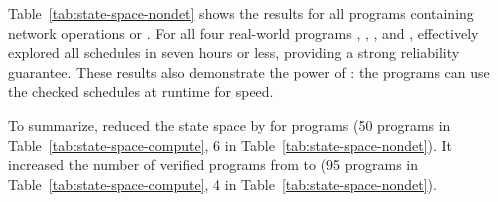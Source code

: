 Table~\ref{tab:state-space-nondet} shows the results for all
\nprognondetandnetwork programs containing network operations or
\nondets.  For all four real-world programs \pfscan, \partition,
\nthelement, and \partialsort, \ecosys effectively explored all
schedules in seven hours or less, providing a strong reliability
guarantee.  These results also demonstrate the power of \xxx:
the programs can use the checked schedules at runtime for speed.

To summarize, \xxx reduced the state space by \shrinkscale for
\nprogshrink programs (50 programs in Table~\ref{tab:state-space-compute},
6 in Table~\ref{tab:state-space-nondet}).  It increased the number of
verified programs from \nprogverifieddbug to \nprogverifiedxxx (95
programs in Table~\ref{tab:state-space-compute}, 4 in
Table~\ref{tab:state-space-nondet}).





